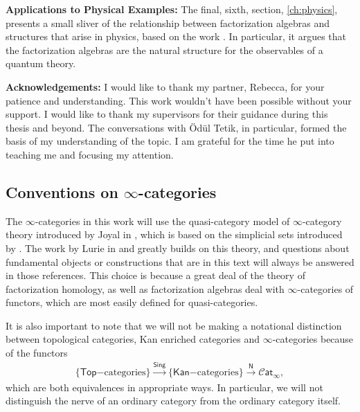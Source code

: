 \documentclass[12pt,a4paper]{article}
\theoremstyle{definition}
\theoremstyle{plain}
\theoremstyle{remark}
\newcommand{\cat}{\mathscr{C} \mathsf{at}_{\infty}}
\begin{document}
\textbf{Applications to Physical Examples:} The final, sixth, section, \cref{ch:physics}, presents a small sliver of the relationship between factorization algebras and structures that arise in physics, based on the work \cite{cg2016}. In particular, it argues that the factorization algebras are the natural structure for the observables of a quantum theory.

\textbf{Acknowledgements:} I would like to thank my partner, Rebecca, for your patience and understanding. This work wouldn't have been possible without your support. I would like to thank my supervisors for their guidance during this thesis and beyond. The conversations with \"Od\"ul Tetik, in particular, formed the basis of my understanding of the topic. I am grateful for the time he put into teaching me and focusing my attention.

\subsection{Conventions on \texorpdfstring{$\infty$}{infinity}-categories}

The $\infty$-categories in this work will use the quasi-category model of $\infty$-category theory introduced by Joyal in \cite{joyal}, which is based on the simplicial sets introduced by \cite{bv73}. The work by Lurie in \cite{lurie_htt} and \cite{lurie_ha} greatly builds on this theory, and questions about fundamental objects or constructions that are in this text will always be answered in those references. This choice is because a great deal of the theory of factorization homology, as well as factorization algebras deal with $\infty$-categories of functors, which are most easily defined for quasi-categories.

It is also important to note that we will not be making a notational distinction between topological categories, Kan enriched categories and $\infty$-categories because of the functors
%
\begin{align}
    \{ \mathsf{Top}\mathrm{-categories}\} \xrightarrow{\mathsf{Sing}} \{ \mathsf{Kan}\mathrm{-categories}\} \xrightarrow{\mathsf{N}} \cat,
\end{align}
%
which are both equivalences in appropriate ways. In particular, we will not distinguish the nerve of an ordinary category from the ordinary category itself.
\end{document}

